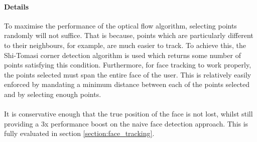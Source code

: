 \paragraph{Details}
To maximise the performance of the optical flow algorithm, selecting points randomly will not suffice. That is because, points which are particularly different to their neighbours, for example, are much easier to track. To achieve this, the Shi-Tomasi corner detection algorithm is used which returns some number of points satisfying this condition. Furthermore, for face tracking to work properly, the points selected must span the entire face of the user. This is relatively easily enforced by mandating a minimum distance between each of the points selected and by selecting enough points. 
\\ \\
It is conservative enough that the true position of the face is not lost, whilst still providing a 3x performance boost on the naive face detection approach. This is fully evaluated in section \ref{section:face_tracking}.


